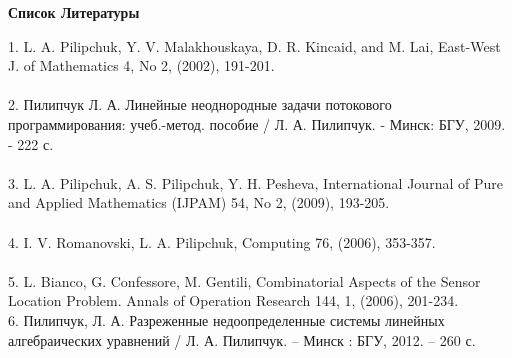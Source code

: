 \documentclass[14pt]{extarticle}%
\begin{document}
\newpage
\begin{center}
    \textbf{Список Литературы}
\end{center}
1. L. A. Pilipchuk, Y. V. Malakhouskaya, D. R. Kincaid, and M. Lai, East-West J. of Mathematics 4, No 2, (2002), 191-201.\\
\\
2. Пилипчук Л. А. Линейные неоднородные задачи потокового программирования: учеб.-метод. пособие / Л. А. Пилипчук. - Минск: БГУ, 2009. - 222 с.\\
\\
3. L. A. Pilipchuk, A. S. Pilipchuk, Y. H. Pesheva, International Journal of Pure and Applied Mathematics (IJPAM) 54, No 2, (2009), 193-205.\\
\\
4. I. V. Romanovski, L. A. Pilipchuk, Computing 76, (2006), 353-357.\\
\\
5. L. Bianco, G. Confessore, M. Gentili, Combinatorial Aspects of the Sensor Location Problem. Annals of Operation Research 144, 1, (2006), 201-234.\\
6. Пилипчук, Л. А. Разреженные недоопределенные системы линейных алгебраических уравнений / Л. А. Пилипчук. – Минск : БГУ, 2012. – 260 с.
\end{document}
